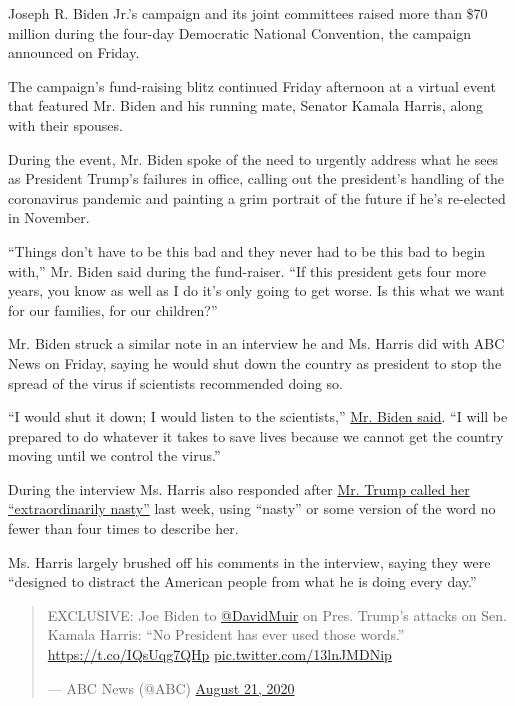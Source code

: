 Joseph R. Biden Jr.'s campaign and its joint committees raised more than
\$70 million during the four-day Democratic National Convention, the
campaign announced on Friday.

The campaign's fund-raising blitz continued Friday afternoon at a
virtual event that featured Mr. Biden and his running mate, Senator
Kamala Harris, along with their spouses.

During the event, Mr. Biden spoke of the need to urgently address what
he sees as President Trump's failures in office, calling out the
president's handling of the coronavirus pandemic and painting a grim
portrait of the future if he's re-elected in November.

``Things don't have to be this bad and they never had to be this bad to
begin with,'' Mr. Biden said during the fund-raiser. ``If this president
gets four more years, you know as well as I do it's only going to get
worse. Is this what we want for our families, for our children?''

Mr. Biden struck a similar note in an interview he and Ms. Harris did
with ABC News on Friday, saying he would shut down the country as
president to stop the spread of the virus if scientists recommended
doing so.

``I would shut it down; I would listen to the scientists,''
\href{https://twitter.com/JTHVerhovek/status/1296939969999667207}{Mr.
Biden said}. ``I will be prepared to do whatever it takes to save lives
because we cannot get the country moving until we control the virus.''

During the interview Ms. Harris also responded after
\href{https://www.nytimes3xbfgragh.onion/2020/08/12/us/politics/trump-women-kamala-harris.html}{Mr.
Trump called her ``extraordinarily nasty''} last week, using ``nasty''
or some version of the word no fewer than four times to describe her.

Ms. Harris largely brushed off his comments in the interview, saying
they were ``designed to distract the American people from what he is
doing every day.''

\begin{quote}
EXCLUSIVE: Joe Biden to
\href{https://twitter.com/DavidMuir?ref_src=twsrc\%5Etfw}{@DavidMuir} on
Pres. Trump's attacks on Sen. Kamala Harris: ``No President has ever
used those words.'' \url{https://t.co/IQsUqg7QHp}
\href{https://t.co/13lnJMDNip}{pic.twitter.com/13lnJMDNip}

--- ABC News (@ABC)
\href{https://twitter.com/ABC/status/1296950347026571266?ref_src=twsrc\%5Etfw}{August
21, 2020}
\end{quote}


